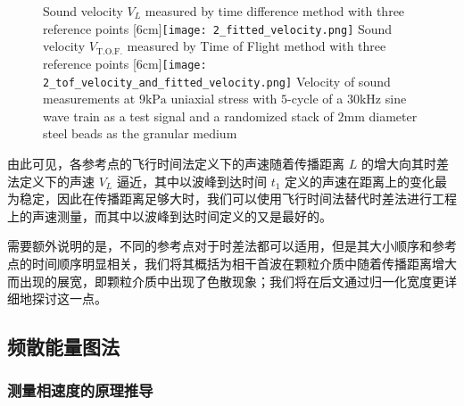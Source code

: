 \begin{figure}[!hbtp]
  \centering
                  {Sound velocity $V_{L}$ measured by time difference method with three reference points}%
                  [6cm]{\texttt{[image: 2\_fitted\_velocity.png]}}
  \hspace{1cm}
                  {Sound velocity $V_{\text{T.O.F.}}$ measured by Time of Flight method with three reference points}%
                  [6cm]{\texttt{[image: 2\_tof\_velocity\_and\_fitted\_velocity.png]}}
            {Velocity of sound measurements at $9\unit{\kilo\Pa}$ uniaxial stress with $5$-cycle of a $30\unit{\kilo\Hz}$ sine wave train as a test signal and a randomized stack of $2\unit{\milli\meter}$ diameter steel beads as the granular medium}
  \label{fig:sound_velocity_measurement}
\end{figure}

由此可见，各参考点的飞行时间法定义下的声速随着传播距离 $L$ 的增大向其时差法定义下的声速 $V_{L}$ 逼近，其中以波峰到达时间 $t_{1}$ 定义的声速在距离上的变化最为稳定，因此在传播距离足够大时，我们可以使用飞行时间法替代时差法进行工程上的声速测量，而其中以波峰到达时间定义的又是最好的。

需要额外说明的是，不同的参考点对于时差法都可以适用，但是其大小顺序和参考点的时间顺序明显相关，我们将其概括为相干首波在颗粒介质中随着传播距离增大而出现的展宽，即颗粒介质中出现了色散现象；我们将在后文通过归一化宽度更详细地探讨这一点。


\subsection{频散能量图法}

\subsubsection{测量相速度的原理推导}

